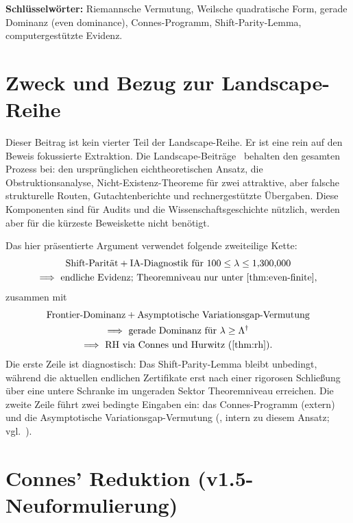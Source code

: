\documentclass[11pt,a4paper]{article}
\theoremstyle{remark}
\theoremstyle{plain}
\begin{document}
\noindent\textbf{Schlüsselwörter:} Riemannsche Vermutung, Weilsche quadratische Form, gerade Dominanz (even dominance), Connes-Programm, Shift-Parity-Lemma, computergestützte Evidenz.

\newpage
\section{Zweck und Bezug zur Landscape-Reihe}

Dieser Beitrag ist kein vierter Teil der Landscape-Reihe. Er ist eine rein auf den Beweis fokussierte Extraktion. Die Landscape-Beiträge~\cite{GeigerLandscapeI,GeigerLandscapeII,GeigerLandscapeIII} behalten den gesamten Prozess bei: den ursprünglichen eichtheoretischen Ansatz, die Obstruktionsanalyse, Nicht-Existenz-Theoreme für zwei attraktive, aber falsche strukturelle Routen, Gutachtenberichte und rechnergestützte Übergaben. Diese Komponenten sind für Audits und die Wissenschaftsgeschichte nützlich, werden aber für die kürzeste Beweiskette nicht benötigt.

Das hier präsentierte Argument verwendet folgende zweiteilige Kette:
\[
\begin{gathered}
\text{Shift-Parität}+\text{IA-Diagnostik für }100\leq\lambda\leq 1{,}300{,}000\\
\Longrightarrow\ \text{endliche Evidenz; Theoremniveau nur unter \Cref{thm:even-finite}},
\end{gathered}
\]
zusammen mit
\[
\begin{gathered}
\text{Frontier-Dominanz}+\text{Asymptotische Variationsgap-Vermutung}\\
\Longrightarrow\ \text{gerade Dominanz für }\lambda\geq\Lambda^\dagger\\
\Longrightarrow\ \text{RH via Connes und Hurwitz (\Cref{thm:rh})}.
\end{gathered}
\]
Die erste Zeile ist diagnostisch: Das Shift-Parity-Lemma bleibt unbedingt, während die aktuellen endlichen Zertifikate erst nach einer rigorosen Schließung über eine untere Schranke im ungeraden Sektor Theoremniveau erreichen. Die zweite Zeile führt zwei bedingte Eingaben ein: das Connes-Programm (extern) und die Asymptotische Variationsgap-Vermutung (, intern zu diesem Ansatz; vgl.\ ).

\section{Connes' Reduktion (v1.5-Neuformulierung)}
\end{document}
